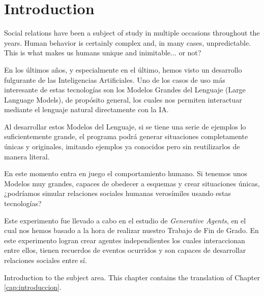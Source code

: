 \chapter*{Introduction}
\label{cap:introduction}


Social relations have been a subject of study in multiple occasions throughout the years. Human behavior is certainly complex and, in many cases, unpredictable. This is what makes us humans unique and inimitable... or not?


En los últimos años, y especialmente en el último, hemos visto un desarrollo fulgurante de las Inteligencias Artificiales. Uno de los casos de uso más interesante de estas tecnologías son los Modelos Grandes del Lenguaje (Large Language Models), de propósito general, los cuales nos permiten interactuar mediante el lenguaje natural directamente con la IA.

Al desarrollar estos Modelos del Lenguaje, si se tiene una serie de ejemplos lo suficientemente grande, el programa podrá generar situaciones completamente únicas y originales, imitando ejemplos ya conocidos pero sin reutilizarlos de manera literal.

En este momento entra en juego el comportamiento humano. Si tenemos unos Modelos muy grandes, capaces de obedecer a esquemas y crear situaciones únicas, ¿podríamos simular relaciones sociales humanas verosímiles usando estas tecnologías?

Este experimento fue llevado a cabo en el estudio de \textit{Generative Agents}, en el cual nos hemos basado a la hora de realizar nuestro Trabajo de Fin de Grado. En este experimento logran crear agentes independientes los cuales interaccionan entre ellos, tienen recuerdos de eventos ocurridos y son capaces de desarrollar relaciones sociales entre sí.

Introduction to the subject area. This chapter contains the translation of Chapter \ref{cap:introduccion}.








